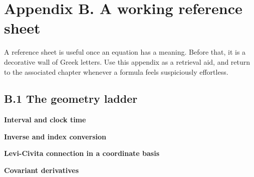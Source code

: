 \documentclass[
  11pt,
  letterpaper,
  oneside,
  openany]{scrbook}
\begin{document}
\hypertarget{appendix-b}{%
\chapter{Appendix B. A working reference sheet}\label{appendix-b}}

A reference sheet is useful once an equation has a meaning. Before that,
it is a decorative wall of Greek letters. Use this appendix as a
retrieval aid, and return to the associated chapter whenever a formula
feels suspiciously effortless.

\hypertarget{b.1-the-geometry-ladder}{%
\section{B.1 The geometry ladder}\label{b.1-the-geometry-ladder}}

\textbf{Interval and clock time}

\begin{center}
\begingroup
{}
\ifdim\wd\grmathbox>\linewidth
\resizebox{\linewidth}{!}{\usebox{\grmathbox}}
\else\usebox{\grmathbox}\fi
\endgroup
\end{center}

\textbf{Inverse and index conversion}

\begin{center}
\begingroup
{}
\ifdim\wd\grmathbox>\linewidth
\resizebox{\linewidth}{!}{\usebox{\grmathbox}}
\else\usebox{\grmathbox}\fi
\endgroup
\end{center}

\textbf{Levi-Civita connection in a coordinate basis}

\begin{center}
\begingroup
{}
\ifdim\wd\grmathbox>\linewidth
\resizebox{\linewidth}{!}{\usebox{\grmathbox}}
\else\usebox{\grmathbox}\fi
\endgroup
\end{center}

\textbf{Covariant derivatives}
\end{document}
